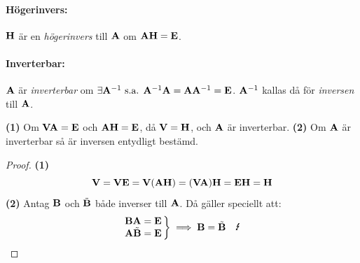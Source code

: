 \paragraph{Högerinvers:} $\mathbf{H}$ är en \emph{högerinvers} till $\mathbf{A}$
om $\mathbf{A}\mathbf{H}=\mathbf{E}$.

\paragraph{Inverterbar:} $\mathbf{A}$ är \emph{inverterbar} om
$\exists\mathbf{A}^{-1}\text{ s.a. }\mathbf{A}^{-1}\mathbf{A}=\mathbf{A}\mathbf{A}^{-1}=\mathbf{E}$.
$\mathbf{A}^{-1}$ kallas då för \emph{inversen} till $\mathbf{A}$.

\begin{lemma}[Inversentydlighet]
	\textbf{(1)} Om $\mathbf{V}\mathbf{A}=\mathbf{E}$ och $\mathbf{A}\mathbf{H}=\mathbf{E}$, då
	$\mathbf{V}=\mathbf{H}$, och $\mathbf{A}$ är inverterbar.
	\textbf{(2)} Om $\mathbf{A}$ är inverterbar så är inversen entydligt bestämd.

	\begin{proof}
		\textbf{(1)}
		$$
			\mathbf{V}=\mathbf{V}\mathbf{E}=\mathbf{V}(\mathbf{A}\mathbf{H})
			=(\mathbf{V}\mathbf{A})\mathbf{H}=\mathbf{E}\mathbf{H}=\mathbf{H}
		$$
		\textbf{(2)} Antag $\mathbf{B}$ och $\tilde{\mathbf{B}}$ både inverser till $\mathbf{A}$.
		Då gäller speciellt att:
		$$
			\left.\begin{matrix}
				\matr{B}\matr{A}=\matr{E}\\
				\matr{A}\tilde{\matr{B}}=\matr{E}
			\end{matrix}\,\right\}\implies\matr{B}=\tilde{\matr{B}}\quad\contra
		$$
	\end{proof}
\end{lemma}

